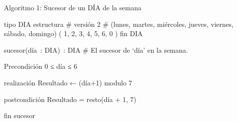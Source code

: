 Algoritmo 1: Sucesor de un DÍA de la semana

tipo DIA estructura
# versión 2
# (lunes, martes, miércoles, jueves, viernes, sábado, domingo)
  (  1,     2,      3,       4,      5,        6,      0    )
fin DIA

sucesor(día : DIA) : DIA
# El sucesor de `día' en la semana.

Precondición
0 ≤ día ≤ 6

realización
Resultado ← (día+1) modulo 7

postcondición
Resultado = resto(día + 1, 7)

fin sucesor